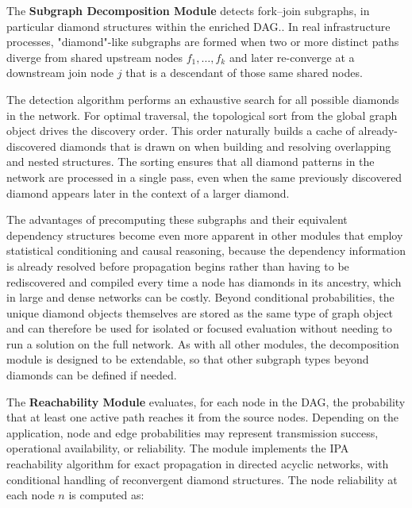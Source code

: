 \documentclass[twocolumn]{rps-esrel2026}
\begin{document}
The \textbf{Subgraph Decomposition Module} detects fork--join subgraphs, in particular diamond structures within the enriched DAG.. In real infrastructure processes, "diamond"-like subgraphs are formed when two or more distinct paths diverge from shared upstream nodes $f_1, \ldots, f_k$ and later re-converge at a downstream join node $j$ that is a descendant of those same shared nodes.

The detection algorithm performs an exhaustive search for all possible diamonds in the network. For optimal traversal, the topological sort from the global graph object drives the discovery order. This order naturally builds a cache of already-discovered diamonds that is drawn on when building and resolving overlapping and nested structures. The sorting ensures that all diamond patterns in the network are processed in a single pass, even when the same previously discovered diamond appears later in the context of a larger diamond.

The advantages of precomputing these subgraphs and their equivalent dependency structures become even more apparent in other modules that employ statistical conditioning and causal reasoning, because the dependency information is already resolved before propagation begins rather than having to be rediscovered and compiled every time a node has diamonds in its ancestry, which in large and dense networks can be costly. Beyond conditional probabilities, the unique diamond objects themselves are stored as the same type of graph object and can therefore be used for isolated or focused evaluation without needing to run a solution on the full network. As with all other modules, the decomposition module is designed to be extendable, so that other subgraph types beyond diamonds can be defined if needed.


The \textbf{Reachability Module} evaluates, for each node in the DAG, the probability that at least one active path reaches it from the source nodes. Depending on the application, node and edge probabilities may represent transmission success, operational availability, or reliability. The module implements the IPA reachability algorithm for exact propagation in directed acyclic networks, with conditional handling of reconvergent diamond structures. The node reliability at each node $n$ is computed as:
\end{document}
